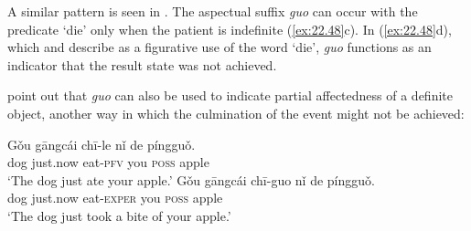 \z \z


A similar pattern is seen in . The aspectual suffix \textit{guo} can occur with the predicate ‘die’ only when the patient is indefinite (\ref{ex:22.48}c). In (\ref{ex:22.48}d), which \citet{Chu1998} and \citet{XiaoMcEnery2004} describe as a figurative use of the word ‘die’, \textit{guo} functions as an indicator that the result state was not achieved.


\ea \label{ex:22.48}
\z \z


\citet[151]{HuangDavis1989} point out that \textit{guo} can also be used to indicate partial affectedness of a definite object, another way in which the culmination of the event might not be achieved:


\ea \label{ex:22.49}
\ea \gll  Gǒu  gāngcái chī-le  nǐ  de  píngguǒ.\\
dog  just.now  eat-\textsc{pfv}  you  \textsc{poss}  apple\\
\glt ‘The dog just ate your apple.’
\ex \gll  Gǒu  gāngcái chī-guo  nǐ  de  píngguǒ.\\
dog  just.now  eat-\textsc{exper}  you  \textsc{poss}  apple\\
\glt ‘The dog just took a bite of your apple.’ 
\z \z


